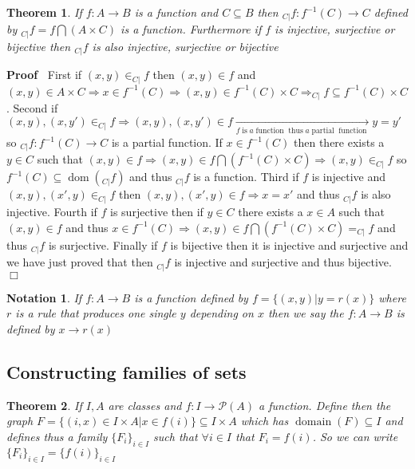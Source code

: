 \documentclass{book}
\newcommand{\Rightarrowlim}{\mathop{\rightarrow}\limits}
\newcommand{\nobracket}{}
\newcommand{\tmop}[1]{\ensuremath{\operatorname{#1}}}
\newenvironment{proof}{\noindent\textbf{Proof\ }}{\hspace*{\fill}$\Box$\medskip}
\newtheorem{notation}{Notation}
{\theorembodyfont{\rmfamily}\newtheorem{note}{Note}}
\newtheorem{theorem}{Theorem}
\begin{document}
{{\begin{theorem}
  \label{image restricted function}If $f : A \rightarrow B$ is a function and
  $C \subseteq B$ then $_{C|} f : f^{- 1} (C) \rightarrow C$ defined by $_{C|}
  f = f \bigcap (A \times C)$ is a function. Furthermore if $f$ is injective,
  surjective or bijective then $_{C|} f$ is also injective, surjective or
  bijective
\end{theorem}

\begin{proof}
  First if $(x, y) \in_{C|} f$ then $(x, y) \in f$ and $(x, y) \in A \times C
  \Rightarrow x \in f^{- 1} (C) \Rightarrow (x, y) \in f^{- 1} (C) \times C
  \Rightarrow_{C|} f \subseteq f^{- 1} (C) \times C$. Second if $(x, y), (x,
  y') \in_{C|} f \Rightarrow (x, y), (x, y') \in f \Rightarrowlim_{f \tmop{is}
  a \tmop{function} \tmop{thus} a \tmop{partial} \tmop{function}} y = y'$ so
  $_{C|} f : f^{- 1} (C) \rightarrow C$ is a partial function. If $x \in f^{-
  1} (C)$ then there exists a $y \in C$ such that $(x, y) \in f \Rightarrow
  (x, y) \in f \bigcap (f^{- 1} (C) \times C) \Rightarrow (x, y) \in_{C|} f$
  so $f^{- 1} (C) \subseteq \tmop{dom} (_{C|} f)$ and thus $_{C|} f$ is a
  function. Third if $f$ is injective and $(x, y), (x', y) \in_{C|} f$ then
  $(x, y), (x', y) \in f \Rightarrow x = x'$ and thus $_{C|} f$ is also
  injective. Fourth if $f$ is surjective then if $y \in C$ there exists a $x
  \in A$ such that $(x, y) \in f$ and thus $x \in f^{- 1} (C) \Rightarrow (x,
  y) \in f \bigcap (f^{- 1} (C) \times C) =_{C|} f$ and thus $_{C|} f$ is
  surjective. Finally if $f$ is bijective then it is injective and surjective
  and we have just proved that then $_{C|} f$ is injective and surjective and
  thus bijective.
\end{proof}

\begin{notation}
  If $f : A \rightarrow B$ is a function defined by $f = \{ (x, y) | y = r (x)
  \nobracket \}$ where $r$ is a rule that produces one single $y$ depending on
  $x$ then we say the $f : A \rightarrow B$ is defined by $x \rightarrow r
  (x)$
\end{notation}

\subsection{Constructing families of sets}

\begin{theorem}
  \label{family of sets defined by set function}If $I, A$ are classes and $f :
  I \rightarrow \mathcal{P} (A)$ a function. Define then the graph $F = \{ (i,
  x) \in I \times A|x \in f (i) \} \subseteq I \times A$ which has
  $\tmop{domain} (F) \subseteq I$ and defines thus a family $\{ F_i \}_{i \in
  I}$ such that $\forall i \in I$ that $F_i = f (i)$. So we can write $\{ F_i
  \}_{i \in I} = \{ f (i) \}_{i \in I}$
\end{theorem}

}}
\end{document}
